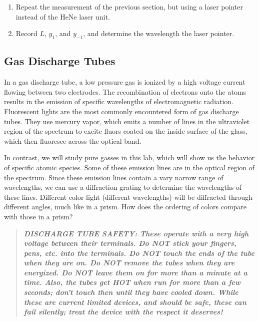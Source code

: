 \documentclass[12pt]{article}
\begin{document}
\begin{enumerate}
\item Repeat the measurement of the previous section, but using a
  laser pointer instead of the HeNe laser unit.  
\item Record $L$, $y_1$, and $y_{-1}$, and determine the wavelength
  the laser pointer.
\end{enumerate}

\subsection{Gas Discharge Tubes}
\label{sec:tubes}

In a gas discharge tube, a low pressure gas is ionized by a high
voltage current flowing between two electrodes.  The recombination of
electrons onto the atoms results in the emission of specific
wavelengths of electromagnetic radiation.  Fluorescent lights are the
most commonly encountered form of gas discharge tubes.  They use
mercury vapor, which emits a number of lines in the ultraviolet region
of the spectrum to excite fluors coated on the inside surface of the
glass, which then fluoresce across the optical band.

In contrast, we will study pure gasses in this lab, which will show us
the behavior of specific atomic species.  Some of these emission lines
are in the optical region of the spectrum.  Since these emission lines
contain a vary narrow range of wavelengths, we can use a diffraction
grating to determine the wavelengths of these lines.  Different color
light (different wavelengths) will be diffracted through different
angles, much like in a prism.  How does the ordering of colors compare
with those in a prism?

\begin{quote}
  \textbf{\textit{DISCHARGE TUBE SAFETY: These operate with a very
      high voltage between their terminals.  Do NOT stick your
      fingers, pens, etc. into the terminals.  Do NOT touch the ends
      of the tube when they are on.  Do NOT remove the tubes when they
      are energized. Do NOT leave them on for more than a minute at a
      time.  Also, the tubes get HOT when run for more than a few
      seconds; don't touch then until they have cooled down.  While
      these are current limited devices, and should be safe, these can
      fail silently; treat the device with the respect it deserves!}}
\end{quote}
\end{document}
